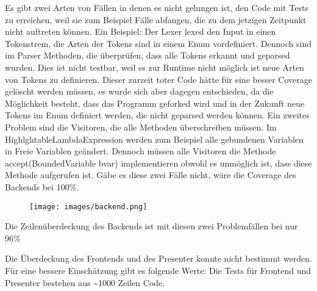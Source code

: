 \documentclass[parskip=full,11pt,twoside]{scrartcl}
\begin{document}
	
	Es gibt zwei Arten von Fällen in denen es nicht gelungen ist, den Code mit Tests zu erreichen, 
	weil sie zum Beispiel Fälle abfangen, die zu dem jetzigen Zeitpunkt nicht auftreten können.
	Ein Beispiel: Der Lexer lexed den Input in einen Tokenstrem, die Arten der Tokens sind in einem Enum vordefiniert.
	Dennoch sind im Parser Methoden, die überprüfen, dass alle Tokens erkannt und geparsed wurden.
	Dies ist nicht testbar, weil es zur Runtime nicht möglich ist neue Arten von Tokens zu definieren.
	Dieser zurzeit toter Code hätte für eine besser Coverage gelöscht werden müssen, es wurde sich aber dagegen entschieden, da die Möglichkeit besteht, 
	dass das Programm geforked wird und in der Zukunft neue Tokens im Enum definiert werden, die nicht geparsed werden können.
	Ein zweites Problem sind die Visitoren, die alle Methoden überschreiben müssen.
	Im HighlghtableLambdaExpression werden zum Beispiel alle gebundenen Variablen in Freie Variablen geändert.
	Dennoch müssen alle Visitoren die Methode accept(BoundedVariable bvar) implementieren obwohl es unmöglich ist, dass diese Methode aufgerufen ist.
	Gäbe es diese zwei Fälle nicht, wäre die Coverage des Backends bei 100\%. 
	
	
	\begin{figure}[H]
		\texttt{[image: images/backend.png]}
	\end{figure}
	
	Die Zeilenüberdeckung des Backends ist mit diesen zwei Problemfällen bei nur 96\% 
	
	
	Die Überdeckung des Frontends und des Presenter konnte nicht bestimmt werden. 
	Für eine bessere Einschätzung gibt es folgende Werte:
	Die Tests für Frontend und Presenter bestehen aus \textasciitilde 1000 Zeilen Code.
	
	
\end{document}
